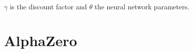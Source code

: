 \documentclass{article}
\begin{document}
\noindent $\gamma$ is the discount factor and $\theta$ the neural network parameters.

\pagebreak




\section{AlphaZero}


\pagebreak
\end{document}
